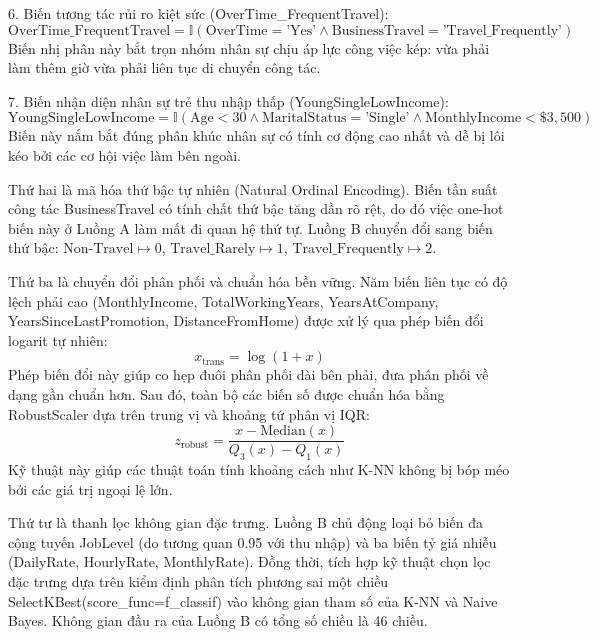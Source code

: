 \documentclass[12pt,a4paper]{article}
\begin{document}
6. Biến tương tác rủi ro kiệt sức (OverTime\_FrequentTravel):
\begin{equation}
\text{OverTime\_FrequentTravel} = \mathbb{I}\left(\text{OverTime} = \text{'Yes'} \land \text{BusinessTravel} = \text{'Travel\_Frequently'}\right)
\end{equation}
Biến nhị phân này bắt trọn nhóm nhân sự chịu áp lực công việc kép: vừa phải làm thêm giờ vừa phải liên tục di chuyển công tác.

7. Biến nhận diện nhân sự trẻ thu nhập thấp (YoungSingleLowIncome):
\begin{equation}
\text{YoungSingleLowIncome} = \mathbb{I}\left(\text{Age} < 30 \land \text{MaritalStatus} = \text{'Single'} \land \text{MonthlyIncome} < \$3{,}500\right)
\end{equation}
Biến này nắm bắt đúng phân khúc nhân sự có tính cơ động cao nhất và dễ bị lôi kéo bởi các cơ hội việc làm bên ngoài.

Thứ hai là mã hóa thứ bậc tự nhiên (Natural Ordinal Encoding). Biến tần suất công tác BusinessTravel có tính chất thứ bậc tăng dần rõ rệt, do đó việc one-hot biến này ở Luồng A làm mất đi quan hệ thứ tự. Luồng B chuyển đổi sang biến thứ bậc: $\text{Non-Travel} \mapsto 0$, $\text{Travel\_Rarely} \mapsto 1$, $\text{Travel\_Frequently} \mapsto 2$.

Thứ ba là chuyển đổi phân phối và chuẩn hóa bền vững. Năm biến liên tục có độ lệch phải cao (MonthlyIncome, TotalWorkingYears, YearsAtCompany, YearsSinceLastPromotion, DistanceFromHome) được xử lý qua phép biến đổi logarit tự nhiên:
\begin{equation}
x_{\text{trans}} = \log(1 + x)
\end{equation}
Phép biến đổi này giúp co hẹp đuôi phân phối dài bên phải, đưa phân phối về dạng gần chuẩn hơn. Sau đó, toàn bộ các biến số được chuẩn hóa bằng RobustScaler dựa trên trung vị và khoảng tứ phân vị IQR:
\begin{equation}
z_{\text{robust}} = \frac{x - \text{Median}(x)}{Q_3(x) - Q_1(x)}
\end{equation}
Kỹ thuật này giúp các thuật toán tính khoảng cách như K-NN không bị bóp méo bởi các giá trị ngoại lệ lớn.

Thứ tư là thanh lọc không gian đặc trưng. Luồng B chủ động loại bỏ biến đa cộng tuyến JobLevel (do tương quan 0.95 với thu nhập) và ba biến tỷ giá nhiễu (DailyRate, HourlyRate, MonthlyRate). Đồng thời, tích hợp kỹ thuật chọn lọc đặc trưng dựa trên kiểm định phân tích phương sai một chiều SelectKBest(score\_func=f\_classif) vào không gian tham số của K-NN và Naive Bayes. Không gian đầu ra của Luồng B có tổng số chiều là 46 chiều.
\end{document}
